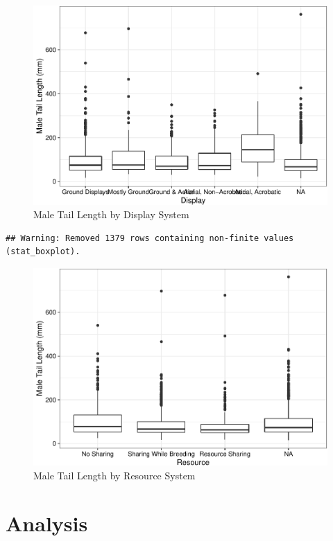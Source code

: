 \documentclass[
  12pt,
]{article}
\begin{document}
\begin{figure}
\centering
\includegraphics{Project_Code_files/figure-latex/r exploratory_plots_5-1.pdf}
\caption{Male Tail Length by Display System}
\end{figure}

\begin{verbatim}
## Warning: Removed 1379 rows containing non-finite values (stat_boxplot).
\end{verbatim}

\begin{figure}
\centering
\includegraphics{Project_Code_files/figure-latex/exploratory_plots_6-1.pdf}
\caption{Male Tail Length by Resource System}
\end{figure}

\newpage

\hypertarget{analysis}{%
\section{Analysis}\label{analysis}}
\end{document}

